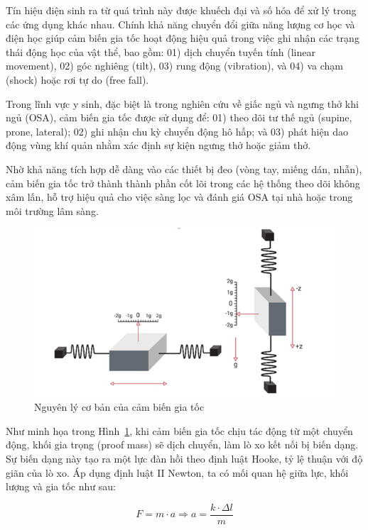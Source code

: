 Tín hiệu điện sinh ra từ quá trình này được khuếch đại và số hóa để xử lý trong các ứng dụng khác nhau. Chính khả năng chuyển đổi giữa năng lượng cơ học và điện học giúp cảm biến gia tốc hoạt động hiệu quả trong việc ghi nhận các trạng thái động học của vật thể, bao gồm: 01) dịch chuyển tuyến tính (linear movement), 02) góc nghiêng (tilt), 03) rung động (vibration), và 04) va chạm (shock) hoặc rơi tự do (free fall).

Trong lĩnh vực y sinh, đặc biệt là trong nghiên cứu về giấc ngủ và ngưng thở khi ngủ (OSA), cảm biến gia tốc được sử dụng để: 01) theo dõi tư thế ngủ (supine, prone, lateral); 02) ghi nhận chu kỳ chuyển động hô hấp; và 03) phát hiện dao động vùng khí quản nhằm xác định sự kiện ngưng thở hoặc giảm thở.

Nhờ khả năng tích hợp dễ dàng vào các thiết bị đeo (vòng tay, miếng dán, nhẫn), cảm biến gia tốc trở thành thành phần cốt lõi trong các hệ thống theo dõi không xâm lấn, hỗ trợ hiệu quả cho việc sàng lọc và đánh giá OSA tại nhà hoặc trong môi trường lâm sàng.
\begin{figure}[!ht]
		\centering
 		\includegraphics[width=\textwidth]{images/acce.png}
 		\vspace*{-7mm}
		\caption{Nguyên lý cơ bản của cảm biến gia tốc}
		\label{acce}
\end{figure}

Như minh họa trong Hình~\ref{acce}, khi cảm biến gia tốc chịu tác động từ một chuyển động, khối gia trọng (proof mass) sẽ dịch chuyển, làm lò xo kết nối bị biến dạng. Sự biến dạng này tạo ra một lực đàn hồi theo định luật Hooke, tỷ lệ thuận với độ giãn của lò xo. Áp dụng định luật II Newton, ta có mối quan hệ giữa lực, khối lượng và gia tốc như sau:

\begin{equation} F = m \cdot a \Rightarrow a = \frac{k \cdot \Delta l}{m} \end{equation}

